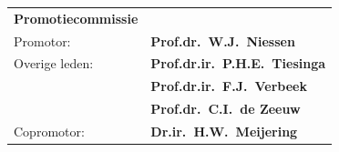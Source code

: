 
\newpage
\thispagestyle{empty}
\label{othersideformal}

\begin{tabular}{@{}ll@{}}
\large\bf{Promotiecommissie} &\\ [8ex]
Promotor:      & {\bf Prof.dr.~W.J.~Niessen}\\[3ex]
Overige leden: & {\bf Prof.dr.ir.~P.H.E.~Tiesinga}\\[1ex]
               & {\bf Prof.dr.ir.~F.J.~Verbeek}\\[1ex]
               & {\bf Prof.dr.~C.I.~de Zeeuw}\\[3ex]
Copromotor:    & {\bf Dr.ir.~H.W.~Meijering}\\
\end{tabular}

\cleardoublepage
